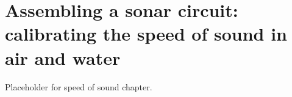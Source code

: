 \setchapterpreamble[u]{\margintoc}
\chapter{Assembling a sonar circuit: calibrating the speed of sound in air and water}

Placeholder for speed of sound chapter.